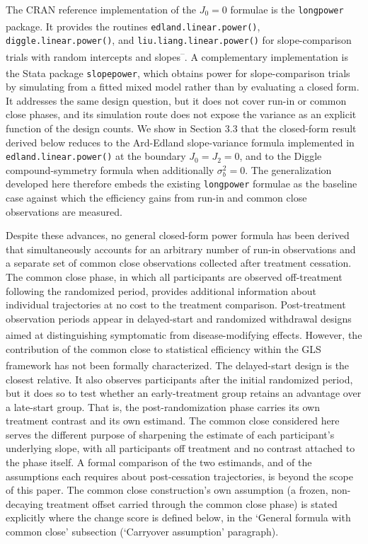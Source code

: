 \documentclass[
  11pt,
]{article}
\begin{document}
The CRAN reference implementation of the \(J_0=0\) formulae is
the \texttt{longpower} package\textsuperscript{}. It provides the routines
\texttt{edland.linear.power()}, \texttt{diggle.linear.power()}, and
\texttt{liu.liang.linear.power()} for slope-comparison trials with
random intercepts and slopes\textsuperscript{--}.
A complementary implementation is the Stata package \texttt{slopepower}\textsuperscript{}, which obtains power for slope-comparison trials by
simulating from a fitted mixed model rather than by evaluating a
closed form. It addresses the same design question, but it does
not cover run-in or common close phases, and its simulation
route does not expose the variance as an explicit function of
the design counts.
We show in Section 3.3 that the closed-form result derived below
reduces to the Ard-Edland slope-variance formula implemented in
\texttt{edland.linear.power()} at the boundary \(J_0 = J_2 = 0\), and
to the Diggle compound-symmetry formula when additionally
\(\sigma_b^2 = 0\). The generalization developed here therefore
embeds the existing \texttt{longpower} formulae as the baseline case
against which the efficiency gains from run-in and common
close observations are measured.

Despite these advances, no general closed-form power formula
has been derived that simultaneously accounts for an arbitrary
number of run-in observations and a separate set of common
close observations collected after treatment cessation. The
common close phase, in which all participants are observed
off-treatment following the randomized period, provides
additional information about individual trajectories at no
cost to the treatment comparison. Post-treatment observation
periods appear in delayed-start and randomized withdrawal
designs aimed at distinguishing symptomatic from
disease-modifying effects\textsuperscript{}. However, the
contribution of the common close to statistical efficiency
within the GLS framework has not been formally characterized.
The delayed-start design\textsuperscript{} is the closest
relative. It also observes participants after the initial
randomized period, but it does so to test whether an
early-treatment group retains an advantage over a late-start
group. That is, the post-randomization phase carries its own
treatment contrast and its own estimand. The common close
considered here serves the different purpose of sharpening the
estimate of each participant's underlying slope, with all
participants off treatment and no contrast attached to the
phase itself. A formal comparison of the two estimands, and of
the assumptions each requires about post-cessation
trajectories, is beyond the scope of this paper. The common
close construction's own assumption (a frozen, non-decaying
treatment offset carried through the common close phase) is
stated explicitly where the change score is defined below, in
the `General formula with common close' subsection
(`Carryover assumption' paragraph).
\end{document}
